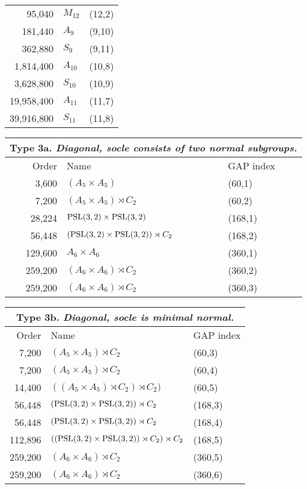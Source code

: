 \begin{center}
{\begin{tabular}{r|l|l}
 95,040 & $M_{12}$ & (12,2) \\
 181,440 & $A_9$ & (9,10) \\
 362,880 & $S_9$ & (9,11) \\
 1,814,400 & $A_{10}$ & (10,8) \\
 3,628,800 & $S_{10}$ & (10,9) \\
 19,958,400 & $A_{11}$ & (11,7) \\
 39,916,800 & $S_{11}$ & (11,8)\\
\end{tabular}


  \begin{tabular}{r|l|l}
  \multicolumn{3}{c}{Type 3a. \emph{Diagonal, socle consists of two normal subgroups.}}\\\toprule
    Order & Name & GAP index \\
\midrule
 3,600 & $(A_5 \times A_5)$ &(60,1) \\
 7,200 & $(A_5 \times A_5) \rtimes C_2$ & (60,2) \\
 28,224 & $\operatorname{PSL}(3,2) \times \operatorname{PSL}(3,2)$ & (168,1) \\
 56,448 & $(\operatorname{PSL}(3,2) \times \operatorname{PSL}(3,2)) \rtimes C_2$ & (168,2) \\
 129,600 & $A_6 \times A_6$ & (360,1) \\
 259,200 & $(A_6 \times A_6) \rtimes C_2$ & (360,2) \\
 259,200 & $(A_6 \times A_6) \rtimes C_2$ & (360,3)\\
\end{tabular}

\vskip1cm

  \begin{tabular}{r|l|l}
  \multicolumn{3}{c}{Type 3b. \emph{Diagonal, socle is minimal normal.}}\\\toprule
    Order & Name & GAP index \\
\midrule
 7,200 & $(A_5 \times A_5) \rtimes C_2$ & (60,3) \\
 7,200 & $(A_5 \times A_5) \rtimes C_2$ & (60,4) \\
 14,400 & $((A_5 \times A_5) \rtimes C_2) \rtimes C_2)$ & (60,5) \\
 56,448 & $(\operatorname{PSL}(3,2) \times \operatorname{PSL}(3,2)) \rtimes C_2$ & (168,3) \\
 56,448 & $(\operatorname{PSL}(3,2) \times \operatorname{PSL}(3,2)) \rtimes C_2$ & (168,4) \\
 112,896 & $((\operatorname{PSL}(3,2) \times \operatorname{PSL}(3,2)) \rtimes C_2) \rtimes C_2$ & (168,5) \\
 259,200 & $(A_6 \times A_6) \rtimes C_2$ & (360,5) \\
 259,200 & $(A_6 \times A_6) \rtimes C_2$ & (360,6)\\
\end{tabular}

}
\end{center}
